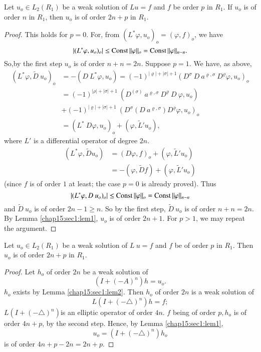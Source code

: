 \begin{second step}%
 Let $u_o \in L_2(R_1)$ be a weak solution of $L u = f$ and $f$ be
 order $p$ in $R_1$. If $u_o$ is of order $n$ in $R_1$, then $u_o$ is
 of order $2 n+p$ in $R_1$. 
\end{second step}

\begin{proof}
 This holds for $p = 0$. For, from $(L^* \varphi, u_o)_o =
 (\varphi,f)_o$, we have 
 $$
 | (L^* \varphi, u_o)_o | \le \operatorname{Const} || \varphi ||_o = \operatorname{Const} ||
 \varphi ||_{n-n}. 
 $$
 So,\pageoriginale by the first step $u_o$ is of order $n + n =
 2n$. Suppose $p =  1$. We have, as above, 
 \begin{align*}
  (L^*\varphi,\tilde{D} ~u_o)_o & = - (D ~ L^* \varphi, u_o) =
  (-1)^{|\varrho|+|\sigma | + 1} (D^\sigma ~ D ~ a^{\varrho,\sigma}
  ~ D^{\varrho}\varphi, u_o)_o\\ 
  & = (-1)^{|\rho|+ | \sigma | +1 } ~ (D^{(\sigma)} ~
  a^{\varrho,\sigma} ~ D^\varrho ~ D ~ \varphi, u_o)\\ 
  & + (-1)^{|\varrho| + | \sigma | + 1} ~ (D^\sigma (D ~
  a^{\varrho,\sigma}) D^\varrho \varphi, u_o)_o\\ 
  & = (L^* ~ D \varphi, u_o)_o + (\varphi, \tilde{L}' u_o),
 \end{align*}
 where $L'$ is a differential operator of degree $2n$. 
 \begin{align*}
  (L^* \varphi, \tilde{D} u_o) & = (D \varphi, f)_o + (\varphi,
  \tilde{L}' u_o)\\ 
  & = -(\varphi, \tilde{D} f) + (\varphi, \tilde{L}' u_o)
 \end{align*}
 (since $f$ is of order $1$ at least; the case $p = 0$ is already
 proved). Thus 
 $$
 | (L^* \varphi, D ~ u_o)_o | \le \operatorname{Const} || \varphi ||_o = \operatorname{Const} ||
 \varphi ||_{n-n} 
 $$
 and $\tilde{D} ~ u_o$ is of order $2n - 1 \ge n$. So by the first
 step, $\tilde{D} ~ u_o$ is of order $n + n = 2n$. By Lemma
 \ref{chap15:sec1:lem1}, $u_o$
 is of order $2n + 1$. For $ p > 1$, we may repeat the argument. 
\end{proof}

\begin{third step}%
 Let $u_o \in L_2(R_1)$ be a weak solution of $L ~ u = f$ and $f$ be
 of order $p$ in $R_1$. Then $u_o$ is of order $2n+p$ in $R_1$. 
\end{third step}

\begin{proof}%
 Let $h_o$ of order $2n$ be a weak solution of 
 $$
 (I + (-A)^n)h = u_o.
 $$
 $h_o$ exists by Lemma \ref{chap15:sec1:lem2}. Then $h_o$ of order $2n$ is a weak
 solution of 
 $$
 L(I + (-\triangle)^n)h = f;
 $$
 $L(I + (-\triangle)^n)$\pageoriginale is an elliptic operator of order $4n$. $f$
 being of order $p,h_o$ is of order $4n + p$, by the second
 step. Hence, by Lemma \ref{chap15:sec1:lem1}, 
 $$
 u_o = (I + (-\triangle)^n)h_o
 $$
 is of order $4n + p - 2n = 2n + p$.
\end{proof}
